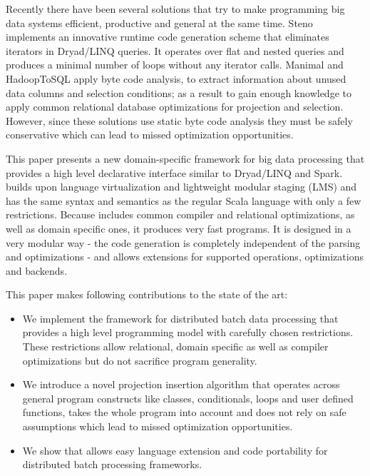 Recently there have been several solutions that try to make programming
big data systems efficient, productive and general at the same time. Steno
\cite{murray_steno:_2011} implements an innovative runtime code generation
scheme that eliminates iterators in Dryad/LINQ queries. It operates over flat
and nested queries and produces a minimal number of loops without any iterator
calls. Manimal \cite{jahani_automatic_2011} and HadoopToSQL
\cite{iu_hadooptosql:_2010} apply byte code analysis, to extract information
about unused data columns and selection conditions; as a result to gain enough
knowledge to apply common relational database optimizations for projection and
selection. However, since these solutions use static byte code analysis they
must be safely conservative which can lead to missed optimization opportunities.

This paper presents a new domain-specific framework \tool for big data
processing that provides a high level declarative interface similar to Dryad/LINQ and Spark. \tool builds upon language virtualization \cite{moors_scala-virtualized_2012} and lightweight modular staging \cite{rompf_lightweight_2010} (LMS) and has the same syntax and semantics as the regular Scala language with only a few restrictions.
Because \tool includes common compiler and relational optimizations, as well as domain specific ones, it produces very fast programs. It is designed in a very modular way - the code generation is completely independent of the parsing and optimizations - and allows extensions for supported operations, optimizations and backends. 

This paper makes following contributions to the state of the art:    
\begin{itemize}

  \item We implement the \tool framework for distributed batch data
  processing that provides a high level programming model with carefully chosen
  restrictions. These restrictions allow relational, domain specific as well as
  compiler optimizations but do not sacrifice program generality.

  \item We introduce a novel projection insertion algorithm that operates across
  general program constructs like classes, conditionals, loops and user defined
  functions, takes the whole program into account and does not rely on safe
  assumptions which lead to missed optimization opportunities.

  \item We show that \tool allows easy language extension and code portability
  for distributed batch processing frameworks.

\end{itemize} 

